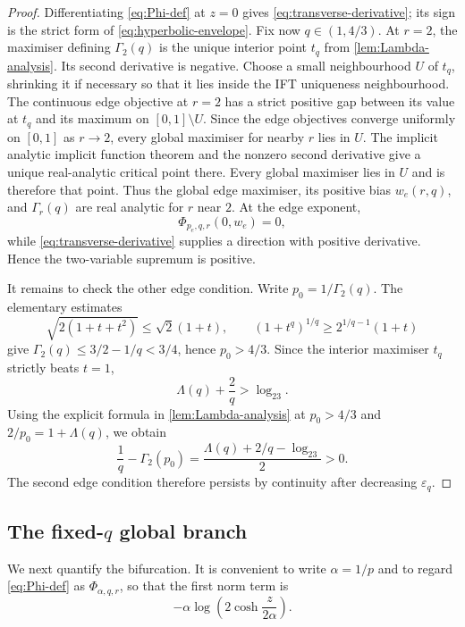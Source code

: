 \documentclass[11pt,reqno]{amsart}
\numberwithin{equation}{section}
\theoremstyle{definition}
\theoremstyle{remark}
\newcommand{\Lambdaq}{\Lambda}
\newcommand{\logtwo}{\log_2}
\begin{document}
\begin{proof}
Differentiating \eqref{eq:Phi-def} at $z=0$ gives
\eqref{eq:transverse-derivative}; its sign is the strict form of
\eqref{eq:hyperbolic-envelope}.  Fix now $q\in(1,4/3)$.  At $r=2$, the
maximiser defining $\Gamma_2(q)$ is the unique interior point $t_q$ from
\cref{lem:Lambda-analysis}.  Its second derivative is negative.  Choose a
small neighbourhood $U$ of $t_q$, shrinking it if necessary so that it lies
inside the IFT uniqueness neighbourhood.  The continuous edge objective at $r=2$
has a strict positive gap between its value at $t_q$ and its maximum on
$[0,1]\setminus U$.  Since the edge objectives converge uniformly on $[0,1]$
as $r\to2$, every global maximiser for nearby $r$ lies in $U$.  The implicit
  analytic implicit function theorem and the nonzero second derivative give a
  unique real-analytic critical point there.  Every global maximiser lies in
  $U$ and is therefore that point.  Thus the global edge maximiser, its
  positive bias $w_e(r,q)$, and $\Gamma_r(q)$ are real analytic for $r$ near
  $2$.  At the edge
exponent,
\[
  \Phi_{p_e,q,r}(0,w_e)=0,
\]
while \eqref{eq:transverse-derivative} supplies a direction with positive
derivative.  Hence the two-variable supremum is positive.

It remains to check the other edge condition.  Write
$p_0=1/\Gamma_2(q)$.  The elementary estimates
\[
  \sqrt{2(1+t+t^2)}\le\sqrt2(1+t),
  \qquad
  (1+t^q)^{1/q}\ge2^{1/q-1}(1+t)
\]
give $\Gamma_2(q)\le3/2-1/q<3/4$, hence $p_0>4/3$.
Since the interior maximiser $t_q$ strictly beats $t=1$,
\[
  \Lambdaq(q)+\frac2q>\logtwo3.
\]
Using the explicit formula in \cref{lem:Lambda-analysis} at $p_0>4/3$ and
$2/p_0=1+\Lambdaq(q)$, we obtain
\[
  \frac1q-\Gamma_2(p_0)
  =\frac{\Lambdaq(q)+2/q-\logtwo3}{2}>0.
\]
The second edge condition therefore persists by continuity after decreasing
$\varepsilon_q$.
\end{proof}

\subsection{The fixed-\texorpdfstring{$q$}{q} global branch}

We next quantify the bifurcation.  It is convenient to write
$\alpha=1/p$ and to regard \eqref{eq:Phi-def} as $\Phi_{\alpha,q,r}$, so that
the first norm term is
\[
  -\alpha\log\left(2\cosh\frac{z}{2\alpha}\right).
\]
\end{document}
